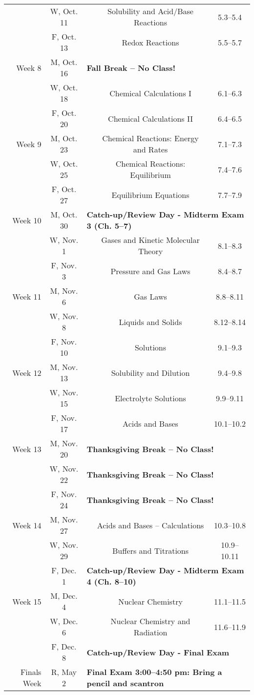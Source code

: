 \documentclass[12pt, letterpaper]{article}
\begin{document}
\begin{tabular}{rcccc}
	& W, Oct. 11&& Solubility and Acid/Base Reactions & 5.3--5.4\\
	& F, Oct. 13&& Redox Reactions & 5.5--5.7\\
	\midrule
	Week 8 & M, Oct. 16& \multicolumn{3}{l}{\textbf{Fall Break -- No Class!}}\\
	& W, Oct. 18&& Chemical Calculations I & 6.1--6.3\\
	& F, Oct. 20&& Chemical Calculations II & 6.4--6.5\\
	\midrule
	Week 9 & M, Oct. 23&& Chemical Reactions: Energy and Rates & 7.1--7.3\\
	& W, Oct. 25&& Chemical Reactions: Equilibrium & 7.4--7.6\\
	& F, Oct. 27&& Equilibrium Equations & 7.7--7.9\\
	\midrule
	Week 10 & M, Oct. 30& \multicolumn{3}{l}{\textbf{Catch-up/Review Day - Midterm Exam 3 (Ch. 5--7)}}\\
	& W, Nov. 1&& Gases and Kinetic Molecular Theory & 8.1--8.3\\
	& F, Nov. 3&& Pressure and Gas Laws & 8.4--8.7\\
	\midrule
	Week 11 & M, Nov. 6&& Gas Laws & 8.8--8.11\\
	& W, Nov. 8&& Liquids and Solids & 8.12--8.14\\
	& F, Nov. 10&& Solutions & 9.1--9.3\\
	\midrule
	Week 12 & M, Nov. 13&& Solubility and Dilution & 9.4--9.8\\
	& W, Nov. 15&& Electrolyte Solutions & 9.9--9.11\\
	& F, Nov. 17&& Acids and Bases & 10.1--10.2\\
	\midrule
	Week 13 & M, Nov. 20& \multicolumn{3}{l}{\textbf{Thanksgiving Break -- No Class!}}\\
	& W, Nov. 22& \multicolumn{3}{l}{\textbf{Thanksgiving Break -- No Class!}}\\
	& F, Nov. 24& \multicolumn{3}{l}{\textbf{Thanksgiving Break -- No Class!}}\\
	\midrule
	Week 14 & M, Nov. 27&& Acids and Bases -- Calculations & 10.3--10.8\\
	& W, Nov. 29&& Buffers and Titrations & 10.9--10.11\\
	& F, Dec. 1& \multicolumn{3}{l}{\textbf{Catch-up/Review Day - Midterm Exam 4 (Ch. 8--10)}}\\
	\midrule
	Week 15 & M, Dec. 4&& Nuclear Chemistry & 11.1--11.5\\
	& W, Dec. 6&& Nuclear Chemistry and Radiation & 11.6--11.9\\
	& F, Dec. 8& \multicolumn{3}{l}{\textbf{Catch-up/Review Day - Final Exam}}\\
	\midrule
	Finals Week& R, May 2& \multicolumn{3}{l}{\textbf{Final Exam 3:00--4:50 pm: Bring a pencil and scantron}}\\
\end{tabular}
~
\end{document}
